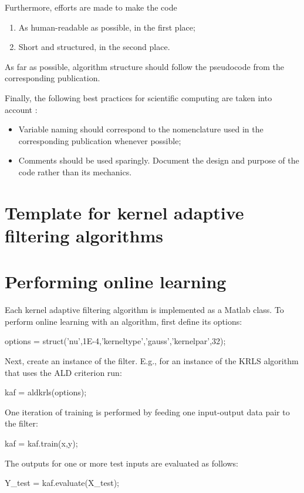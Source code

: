 \documentclass[]{report}
\begin{document}
Furthermore, efforts are made to make the code
\begin{enumerate}
\item As human-readable as possible, in the first place;
\item Short and structured, in the second place.
\end{enumerate}
As far as possible, algorithm structure should follow the pseudocode from the corresponding publication.

Finally, the following best practices for scientific computing are taken into account \cite{wilson2014best}:
\begin{itemize}
\item Variable naming should correspond to the nomenclature used in the corresponding publication whenever possible;
\item Comments should be used sparingly. Document the design and purpose of the code rather than its mechanics.
\end{itemize}

\section{Template for kernel adaptive filtering algorithms}



\section{Performing online learning}

Each kernel adaptive filtering algorithm is implemented as a Matlab class. To perform online learning with an algorithm, first define its options:
\begin{shortlisting}
options = struct('nu',1E-4,'kerneltype','gauss','kernelpar',32);
\end{shortlisting}
Next, create an instance of the filter. E.g., for an instance of the KRLS algorithm that uses the ALD criterion run:
\begin{shortlisting}
kaf = aldkrls(options);
\end{shortlisting}
One iteration of training is performed by feeding one input-output data pair to the filter:
\begin{shortlisting}
kaf = kaf.train(x,y);
\end{shortlisting}
The outputs for one or more test inputs are evaluated as follows:
\begin{shortlisting}
Y_test = kaf.evaluate(X_test);
\end{shortlisting}
\end{document}
